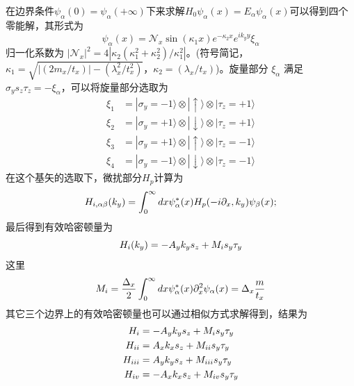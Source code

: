  在边界条件$\psi_\alpha(0)=\psi_\alpha(+\infty)$下来求解$H_0\psi_\alpha(x)=E_\alpha\psi_\alpha(x)$可以得到四个零能解，其形式为
\begin{equation}
\psi_\alpha(x)=\mathcal{N}_x\sin(\kappa_1x)e^{-\kappa_2x}e^{ik_yy}\xi_\alpha
\end{equation}
归一化系数为 $|\mathcal{N}_x|^2=4|\kappa_2(\kappa_1^2+\kappa_2^2)/\kappa_1^2|$。(符号简记，$\kappa_1=\sqrt{|(2m_x/t_x)|-(\lambda_x^2/t_x^2)}$，$ \kappa_2=(\lambda_x/t_x)$)。旋量部分 $\xi_\alpha$ 满足 $\sigma_ys_z\tau_z=-\xi_\alpha$，可以将旋量部分选取为
\begin{equation}
\begin{aligned}
\xi_1&=|\sigma_y=-1\rangle\otimes|\uparrow\rangle\otimes|\tau_z=+1\rangle\\
\xi_2&=|\sigma_y=+1\rangle\otimes|\downarrow\rangle\otimes|\tau_z=+1\rangle\\
\xi_3&=|\sigma_y=+1\rangle\otimes|\uparrow\rangle\otimes|\tau_z=-1\rangle\\
\xi_4&=|\sigma_y=-1\rangle\otimes|\downarrow\rangle\otimes|\tau_z=-1\rangle
\end{aligned}
\end{equation}
在这个基矢的选取下，微扰部分$H_p$计算为
\begin{equation}
H_{\uppercase\expandafter{\romannumeral1},\alpha\beta}(k_y)=\int_{0}^{\infty}dx\psi^*_\alpha(x)H_p(-i\partial_x,k_y)\psi_\beta(x);
\end{equation}
最后得到有效哈密顿量为
\begin{equation}
H_{\uppercase\expandafter{\romannumeral1}}(k_y)=-A_yk_ys_z+M_{\uppercase\expandafter{\romannumeral1}}s_y\tau_y
\end{equation}
这里
\begin{equation}
M_{\uppercase\expandafter{\romannumeral1}}=\frac{\Delta_x}{2}\int_{0}^{\infty}dx\psi_\alpha^*(x)\partial_x^2\psi_\alpha(x)=\Delta_x\frac{m}{t_x}
\end{equation}
其它三个边界上的有效哈密顿量也可以通过相似方式求解得到，结果为
\begin{equation}
\begin{aligned}
H_{\uppercase\expandafter{\romannumeral1}}&=-A_yk_ys_z+M_{\uppercase\expandafter{\romannumeral1}}s_y\tau_y\\
H_{\uppercase\expandafter{\romannumeral2}}&=A_xk_xs_z+M_{\uppercase\expandafter{\romannumeral2}}s_y\tau_y\\
H_{\uppercase\expandafter{\romannumeral3}}&=A_yk_ys_z+M_{\uppercase\expandafter{\romannumeral3}}s_y\tau_y\\
H_{\uppercase\expandafter{\romannumeral4}}&=-A_xk_xs_z+M_{\uppercase\expandafter{\romannumeral4}}s_y\tau_y\\\label{edge1}
\end{aligned}
\end{equation}
